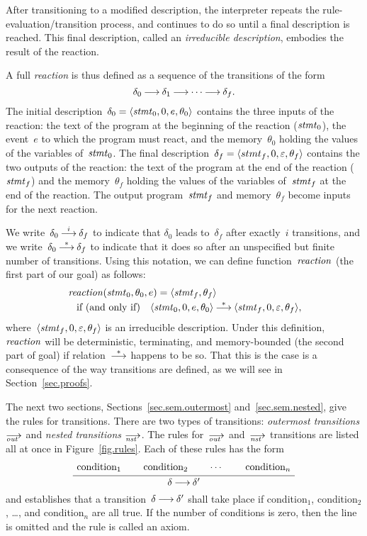 After transitioning to a modified description, the interpreter repeats the
rule-evaluation/transition process, and continues to do so until a final
description is reached.  This final description, called an \emph{irreducible
  description}, embodies the result of the reaction.

A full \emph{reaction} is thus defined as a sequence of the transitions of
the form
\[
  \delta_0\trans\delta_1\trans\cdots\trans\delta_f.
\]
The initial description~$\delta_0=\<\stmt_0,0,e,\theta_0>$ contains the
three inputs of the reaction: the text of the program at the beginning of
the reaction ($\mathit{stmt}_0$), the event~$e$ to which the program must react, and
the memory~$\theta_0$ holding the values of the variables of~$\mathit{stmt}_0$.  The
final description~$\delta_f=\<stmt_f,0,\nil,\theta_f>$ contains the two
outputs of the reaction: the text of the program at the end of the reaction
($\mathit{stmt}_f$) and the memory~$\theta_f$ holding the values of the variables
of~$\mathit{stmt}_f$ at the end of the reaction.  The output program~$\mathit{stmt}_f$ and
memory~$\theta_f$ become inputs for the next reaction.

We write~$\delta_0\trans[i]\delta_f$ to indicate that $\delta_0$ leads
to~$\delta_f$ after exactly~$i$ transitions, and we
write~$\delta_0\trans[*]\delta_f$ to indicate that it does so after an
unspecified but finite number of transitions.  Using this notation, we can
define function~$\mathop{\mathit{reaction}}$ (the first part of our goal) as follows:
\begin{align*}
  &\reaction(\stmt_0,\theta_0,e)=\<\stmt_f,\theta_f>\\
  &\quad\text{if (and only if)}\quad
    \<\stmt_0,0,e,\theta_0>\trans[*]\<\stmt_f,0,\nil,\theta_f>,
\end{align*}
where~$\<\stmt_f,0,\nil,\theta_f>$ is an irreducible description.  Under
this definition, $\mathop{\mathit{reaction}}$ will be deterministic, terminating, and
memory-bounded (the second part of goal) if relation~$\trans[*]$ happens to
be so.  That this is the case is a consequence of the way transitions are
defined, as we will see in Section~\ref{sec.proofs}.

The next two sections, Sections~\ref{sec.sem.outermost}
and~\ref{sec.sem.nested}, give the rules for transitions.  There are two
types of transitions: \emph{outermost transitions} $\out$ and \emph{nested
  transitions} $\nst$.  The rules for~$\out$ and~$\nst$ transitions are
listed all at once in Figure~\ref{fig.rules}.  Each of these rules has the
form
\[
  \AxiomC{\strut condition$_1$}
  \AxiomC{\strut condition$_2$}
  \AxiomC{$\cdots$}
  \AxiomC{\strut condition$_n$}
  \QuaternaryInfC{$\delta\trans\delta'$}
  \DisplayProof
\]
and establishes that a transition~$\delta\trans\delta'$ shall take place if
condition$_1$, condition$_2$, \dots, and condition$_n$ are all true.  If the
number of conditions is zero, then the line is omitted and the rule is
called an axiom.

